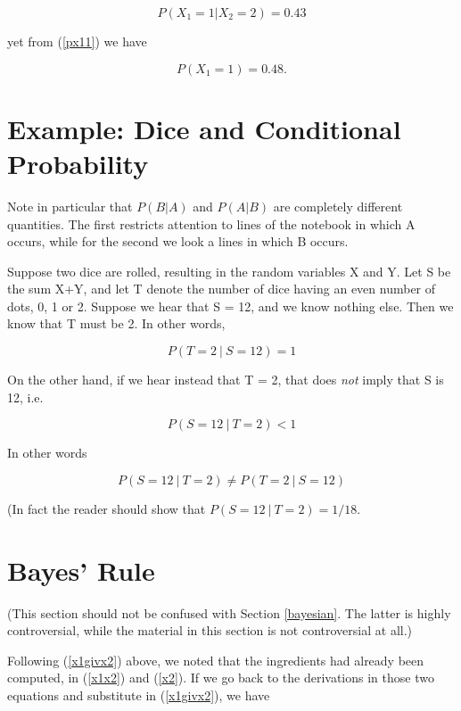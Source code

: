 \begin{equation}
P(X_1 = 1 | X_2 = 2) = 0.43
\end{equation}

yet from (\ref{px11}) we have

\begin{equation}
P(X_1 = 1) = 0.48.
\end{equation}

\section{Example: Dice and Conditional Probability}

Note in particular that $P(B | A)$ and $P(A | B)$ are completely
different quantities.  The first restricts attention to lines of the
notebook in which A occurs, while for the second we look a lines in
which B occurs.

Suppose two dice are rolled, resulting in the random variables X and Y.
Let S be the sum X+Y, and let T denote the number of dice having an
even number of dots, 0, 1 or 2.  Suppose we hear that S = 12, and we know
nothing else.  Then we know that T must be 2.  In other words,

\begin{equation}
P(T = 2 ~|~ S = 12) = 1
\end{equation}

On the other hand, if we hear instead that T = 2, that does {\it not}
imply that S is 12, i.e.

\begin{equation}
P(S = 12 ~|~ T = 2) < 1
\end{equation}

In other words

\begin{equation}
P(S = 12 ~|~ T = 2) \neq
P(T = 2 ~|~ S = 12)
\end{equation}

(In fact the reader should show that $P(S = 12 ~|~ T = 2) = 1/18$.

\section{Bayes' Rule}
\label{bayesthm}

(This section should not be confused with Section \ref{bayesian}.  The
latter is highly controversial, while the material in this section is
not controversial at all.)

Following (\ref{x1givx2}) above, we noted that the ingredients had
already been computed, in (\ref{x1x2}) and (\ref{x2}).  If we go back
to the derivations in those two equations and substitute in
(\ref{x1givx2}), we have

